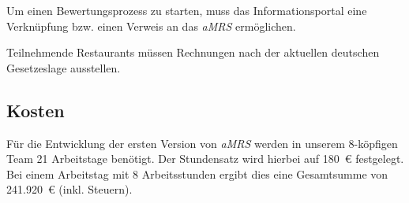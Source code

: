 Um einen Bewertungsprozess zu starten, muss das Informationsportal eine Verknüpfung bzw. einen Verweis an das \textit{\ac{aMRS}} ermöglichen.

Teilnehmende Restaurants müssen Rechnungen nach der aktuellen deutschen Gesetzeslage ausstellen.

\subsection*{Kosten}


Für die Entwicklung der ersten Version von \textit{\ac{aMRS}} werden in unserem 8-köpfigen Team 21 Arbeitstage benötigt. 
Der Stundensatz wird hierbei auf 180~€ festgelegt.
Bei einem Arbeitstag mit 8 Arbeitsstunden ergibt dies eine Gesamtsumme von 241.920~€ (inkl. Steuern).


